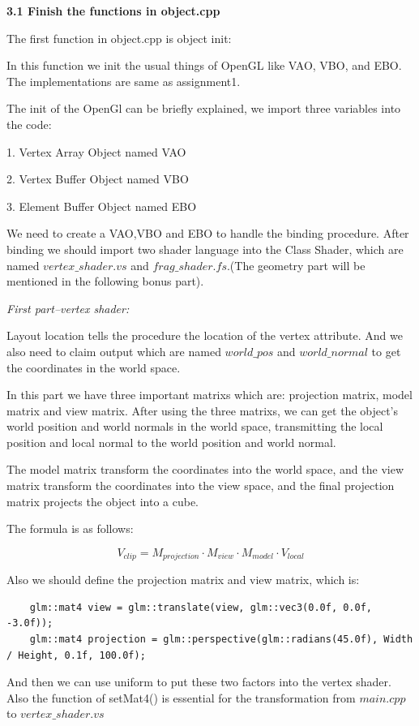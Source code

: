 \documentclass[acmtog]{acmart}
\begin{document}
\textbf{3.1 Finish the functions in object.cpp}

The first function in object.cpp is object init:

In this function we init the usual things of OpenGL like VAO, VBO, and EBO.
The implementations are same as assignment1.

The init of the OpenGl can be briefly explained, we import three variables into the code:

1. Vertex Array Object named VAO

2. Vertex Buffer Object named VBO

3. Element Buffer Object named EBO

We need to create a VAO,VBO and EBO to handle the binding procedure. After binding we should import two shader language into the Class Shader, which are named $vertex\_shader.vs$ and $frag\_shader.fs$.(The geometry part will be mentioned in the following bonus part).

\textcolor[rgb]{1,0,0}{\textit{First part--vertex shader:}}

Layout location tells the procedure the location of the vertex attribute. And we also need to claim output which are named $world\_pos$ and $world\_normal$ to get the coordinates in the world space.

In this part we have three important matrixs which are: projection matrix, model matrix and view matrix. After using the three matrixs, we can get the object's world position and world normals in the world space, transmitting the local position and local normal to the world position and world normal. 

The model matrix transform the coordinates into the world space, and the view matrix transform the coordinates into the view space, and the final projection matrix projects the object into a cube.

The formula is as follows:

$$V_{clip}=M_{projection}\cdot M_{view} \cdot M_{model} \cdot V_{local}$$ 

Also we should define the projection matrix and view matrix, which is:

\begin{lstlisting}
	glm::mat4 view = glm::translate(view, glm::vec3(0.0f, 0.0f, -3.0f));
	glm::mat4 projection = glm::perspective(glm::radians(45.0f), Width / Height, 0.1f, 100.0f);
\end{lstlisting}

And then we can use uniform to put these two factors into the vertex shader. Also the function of setMat4() is essential for the transformation from $main.cpp$ to $vertex\_shader.vs$
\end{document}
